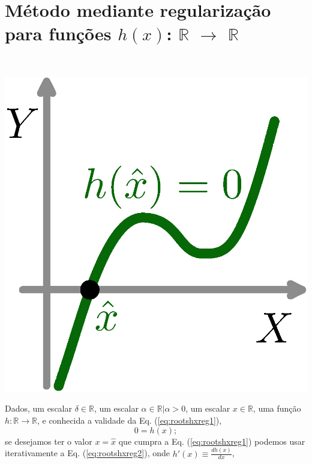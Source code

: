 
\section{ Método mediante regularização para funções $h(x)$: $\mathbb{R}$ $\rightarrow$ $\mathbb{R}$ }

\begin{theorem}\label{theo:rootshxreg}
~\\
\begin{minipage}{0.2\textwidth}
\centering
\includegraphics[width=0.95\linewidth]{chapters/roots/roots1.eps} 
\end{minipage}
\begin{minipage}{0.8\textwidth}
Dados,
um escalar $\delta \in \mathbb{R}$, 
um escalar $\alpha \in \mathbb{R}| \alpha>0$, 
um escalar $x \in \mathbb{R}$, 
uma função $h:\mathbb{R} \rightarrow \mathbb{R}$, e 
conhecida a validade da Eq. (\ref{eq:rootshxreg1}),
\begin{equation}\label{eq:rootshxreg1}
0=h(x);
\end{equation}
se desejamos ter o valor $x=\hat{x}$ que cumpra a Eq. (\ref{eq:rootshxreg1})
podemos usar iterativamente a Eq. (\ref{eq:rootshxreg2}),
onde  $h'(x)\equiv \frac{d h(x)}{d x}$,
\end{minipage}


\end{theorem}
